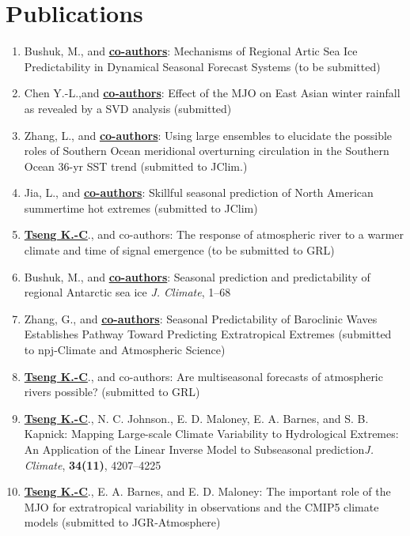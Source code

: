 \documentclass{article}
\begin{document}
\section{\color{airforceblue}Publications}
\begin{enumerate}
	\item Bushuk, M., and \normalsize{\bf{\underline{co-authors}}}: Mechanisms of Regional Artic Sea Ice Predictability in Dynamical Seasonal Forecast Systems (to be submitted)
	\item Chen Y.-L.,and \normalsize{\bf{\underline{co-authors}}}: Effect of the MJO on East Asian winter rainfall as revealed by a SVD analysis (submitted)
	\item Zhang, L., and \normalsize{\bf{\underline{co-authors}}}: Using large ensembles to elucidate the possible roles of Southern Ocean meridional overturning circulation in the Southern Ocean 36-yr SST trend (submitted to JClim.)
	\item Jia, L., and \normalsize{\bf{\underline{co-authors}}}: Skillful seasonal prediction of North American summertime hot extremes (submitted to JClim)
	\item \normalsize{\bf{\underline{Tseng K.-C}}}., and co-authors: The response of atmospheric river to a warmer climate and time of signal emergence (to be submitted to GRL) \par
	\item Bushuk, M., and \normalsize{\bf{\underline{co-authors}}}: Seasonal prediction and predictability of regional Antarctic sea ice \textit{J. Climate}, 1--68 \par
	\item Zhang, G., and \normalsize{\bf{\underline{co-authors}}}: Seasonal Predictability of Baroclinic Waves Establishes Pathway Toward Predicting Extratropical Extremes (submitted to npj-Climate and Atmospheric Science) \par
    \item \normalsize{\bf{\underline{Tseng K.-C}}}., and co-authors: Are multiseasonal forecasts of atmospheric rivers possible? (submitted to GRL)\par
	\item \normalsize{\bf{\underline{Tseng K.-C}}}., N. C. Johnson., E. D. Maloney, E. A. Barnes, and S. B. Kapnick: Mapping Large-scale Climate Variability to Hydrological Extremes: An Application of the Linear Inverse Model to Subseasonal prediction\textit{J. Climate}, \normalsize{\bf{34(11)}}, 4207--4225 \par
	\item \normalsize{\bf{\underline{Tseng K.-C}}}., E. A. Barnes, and E. D. Maloney: The important role of the MJO for extratropical variability in observations and the CMIP5 climate models (submitted to JGR-Atmosphere)   

\end{enumerate}
\end{document}
